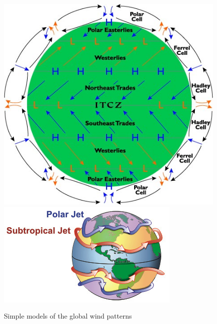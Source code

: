 \documentclass{article}
\begin{document}
\begin{figure}[H]
\centering
	\includegraphics[scale=0.6]{./Images/BC4_WindPattern.jpg}
	\includegraphics[scale=0.8]{./Images/BC4_JetStream.jpg}
	\caption{Simple models of the global wind patterns}
\end{figure}
\end{document}
